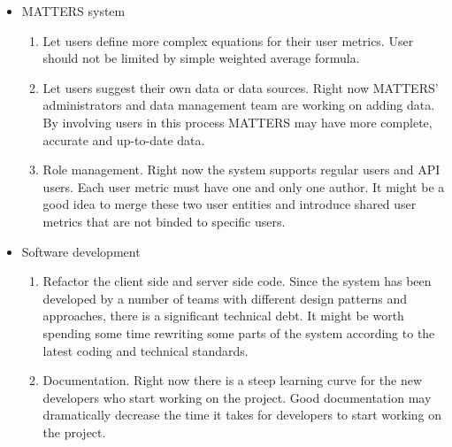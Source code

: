  	\begin{itemize}
 		\item MATTERS system
 		\begin{enumerate}
 			\item
 			Let users define more complex equations for their user metrics.
 			User should not be limited by simple weighted average formula.
 			\item
 			Let users suggest their own data or data sources. Right now 
 			MATTERS' administrators and data management team are working on
 			adding data. By involving users in this process MATTERS may have 
 			more complete, accurate and up-to-date data.
 			\item
 			Role management. Right now the system supports regular users and API users. 
 			Each user metric must have one and only one author. It might be a good idea 
 			to merge these two user entities and introduce shared user metrics that are 
 			not binded to specific users.
 		\end{enumerate}
 		\item Software development
 		\begin{enumerate}
 			\item
 			Refactor the client side and server side code. Since the system 
 			has been developed by a number of teams with different design 
 			patterns and approaches, there is a significant technical debt. 
 			It might be worth spending some time rewriting some parts of the system 
 			according to the latest coding and technical standards.
 			\item
 			Documentation. Right now there is a steep learning curve for the new 
 			developers who start working on the project. Good documentation may 
 			dramatically decrease the time it takes for developers to start working 
 			on the project.
 		\end{enumerate}
 	\end{itemize}